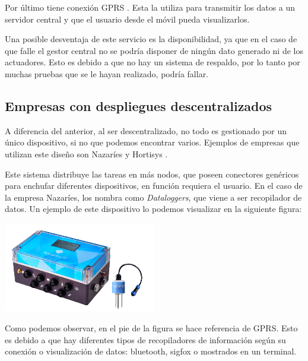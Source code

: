 Por último tiene conexión \ac{GPRS}%
. 
Esta la utiliza para transmitir los datos a un servidor central y que el usuario desde el móvil pueda visualizarlos.


Una posible desventaja de este servicio es la disponibilidad, ya que en el caso de que falle el %
gestor central no se podría disponer de ningún dato generado ni de los actuadores. Esto es debido a que no hay un sistema de respaldo, por lo tanto por muchas pruebas que se le hayan realizado, podría fallar.

\subsection{Empresas con despliegues descentralizados}

A diferencia del anterior, al ser descentralizado, no todo es gestionado por un único dispositivo, si no que podemos encontrar varios. Ejemplos de empresas que utilizan este diseño son Nazaríes \cite{nazaries} y Hortisys \cite{hortisys}.

Este sistema distribuye las tareas en más nodos, que poseen conectores genéricos para enchufar diferentes dispositivos, en función requiera el usuario. En el caso de la empresa Nazaríes, los nombra como \textit{Dataloggers}, que viene a ser recopilador de datos. Un ejemplo de este dispositivo lo podemos visualizar en la siguiente figura:

\begin{center}
    \centering
    \includegraphics[width=0.5\textwidth]{img/03-Datalogger-Nazaries.png}
    \label{fig:datalogger-nazaries}
\end{center}

Como podemos observar, en el pie de la figura se hace referencia de GPRS. Esto es debido a que hay diferentes tipos de recopiladores de información según su conexión o visualización de datos: bluetooth, sigfox \cite{sigfox} o mostrados en un terminal.

